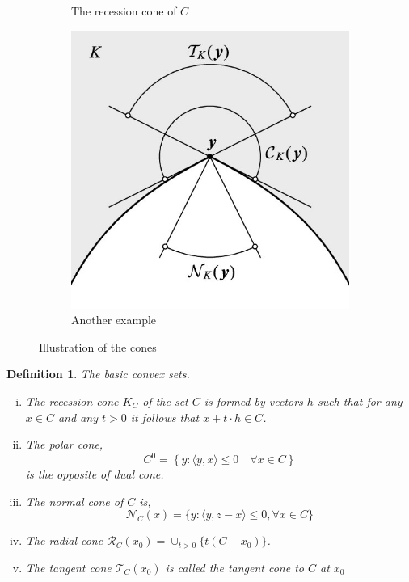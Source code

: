 \documentclass{beamerswitch}
\newtheorem{defn}[thm]{Definition}
\begin{document}
\begin{figure}[h!]
\begin{subfigure}[b]{0.3\textwidth}
        \caption{The recession cone of \(C\)}
        \label{fig:recession-cone}
    \end{subfigure}
    \begin{subfigure}[b]{0.4\textwidth}
        \centering
        \includegraphics[width=1\linewidth]{figs/Contingent-tangent-and-normal-cone-on-a-non-convex-set-K-R-2_Q640.jpeg}
        \caption{Another example}
        \label{fig:recession-cone}
    \end{subfigure}
    \caption{Illustration of the cones}
    \label{fig:cone-illustration}
\end{figure}
\begin{defn} The basic convex sets.

    \begin{enumerate}[(i)]
        \item The recession cone \(K_C\) of the set \(C\) is formed by vectors \(h\) such that for any \(x \in C\) and any \(t > 0\) it follows that \(x + t\cdot h \in C\).
        \item The polar cone,
              \begin{equation}C^{0}=\left\{y:\langle y, x\rangle \leq 0 \quad \forall x \in C\right\}
              \end{equation}
              is the opposite of dual cone.
        \item The normal cone of \(C\) is,
              \begin{equation}
                  \mathcal N_C(x) = \{y: \langle y,  z-x \rangle \le 0, \forall x \in C\}
              \end{equation}
        \item The radial cone \(\mathcal R_C(x_0) = \cup_{t>0}\{ t(C - x_0) \}\).
        \item The tangent cone \(\mathcal T_C(x_0)\) is called the tangent cone to \(C\) at \(x_0\)
    \end{enumerate}

\end{defn}
\end{document}
